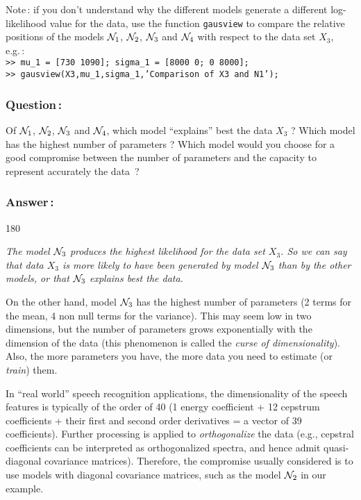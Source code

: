 \documentclass[twoside,a4paper,titlepage]{article}
\newcommand{\mat}[1]{{\tt >> #1} \\}
\newcommand{\com}[1]{{\tt #1}}
\newcommand{\expl}[1]{%
\begin{turn}{180}%
\parbox{\textwidth}{\em #1}%
\end{turn}%
}
\newcommand{\tab}{\hspace{1em}}
\begin{document}
\noindent Note\,: if you don't understand why the different models generate
a different log-likelihood value for the data, use the function
\com{gausview} to compare the relative positions of the models ${\cal
N}_1$, ${\cal N}_2$, ${\cal N}_3$ and ${\cal N}_4$ with respect to the data
set $X_3$, e.g.\,: \\
%
\mat{mu\_1 = [730 1090]; sigma\_1 = [8000 0; 0 8000];}
\mat{gausview(X3,mu\_1,sigma\_1,'Comparison of X3 and N1');}

\vspace{-\baselineskip}
\subsubsection*{Question\,:}
Of ${\cal N}_1$, ${\cal N}_2$, ${\cal N}_3$ and ${\cal N}_4$, which model
``explains'' best the data $X_3$ ?  Which model has the highest number of
parameters ?  Which model would you choose for a good compromise between
the number of parameters and the capacity to represent accurately the
data~?

\subsubsection*{Answer\,:}
\expl{The model ${\cal N}_3$ produces the highest likelihood for the data
set $X_3$. So we can say that data $X_3$ is more likely to have been
generated by model ${\cal N}_3$ than by the other models, or that ${\cal
N}_3$ explains best the data.

\tab On the other hand, model ${\cal N}_3$ has the highest number of
parameters (2 terms for the mean, 4 non null terms for the variance). This
may seem low in two dimensions, but the number of parameters grows
exponentially with the dimension of the data (this phenomenon is called the
{\em curse of dimensionality}). Also, the more parameters you have, the
more data you need to estimate (or {\em train}) them.

\tab In ``real world'' speech recognition applications, the dimensionality
of the speech features is typically of the order of 40 (1 energy
coefficient + 12 cepstrum coefficients + their first and second order
derivatives = a vector of 39 coefficients). Further processing is applied
to {\em orthogonalize} the data (e.g., cepstral coefficients can be
interpreted as orthogonalized spectra, and hence admit quasi-diagonal
covariance matrices).  Therefore, the compromise usually considered is to
use models with diagonal covariance matrices, such as the model ${\cal
N}_2$ in our example.}
\end{document}
